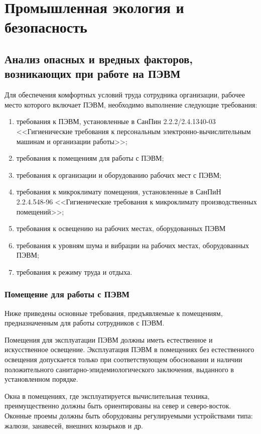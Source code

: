 \newpage

\section{Промышленная экология и безопасность}
\subsection{Анализ опасных и вредных факторов, возникающих при работе на ПЭВМ}
Для обеспечения комфортных условий труда сотрудника организации, рабочее место которого включает ПЭВМ, необходимо выполнение следующие требования\cite{SanPinGigiena}:
\begin{enumerate}
\item требования к ПЭВМ, установленные в СанПин 2.2.2/2.4.1340-03 <<Гигиенические требования к персональным электронно-вычислительным машинам и организации работы>>;
\item требования к помещениям для работы с ПЭВМ;
\item требования к организации и оборудованию рабочих мест с ПЭВМ;
\item требования к микроклимату помещения, установленные в  СанПиН \\2.2.4.548-96 <<Гигиенические требования к микроклимату производственных помещений>>;
\item требования к освещению на рабочих местах, оборудованных ПЭВМ
\item требования к уровням шума и вибрации на рабочих местах, оборудованных ПЭВМ;
\item требования к режиму труда и отдыха.
\end{enumerate}

\subsubsection{Помещение для работы с ПЭВМ}

Ниже приведены основные требования, предъявляемые к помещениям, предназначенным для работы сотрудников с ПЭВМ.

Помещения для эксплуатации ПЭВМ должны иметь естественное и искусственное освещение. Эксплуатация ПЭВМ в помещениях без естественного освещения допускается только при соответствующем обосновании и наличии положительного санитарно-эпидемиологического заключения, выданного в установленном порядке.

Окна в помещениях, где эксплуатируется вычислительная техника, преимущественно должны быть ориентированы на север и северо-восток. Оконные проемы должны быть оборудованы регулируемыми устройствами типа: жалюзи, занавесей, внешних козырьков и др.

